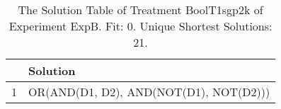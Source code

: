 \begin{table}[ht]
\centering
\begin{tabular}{rp{9cm}}
  \hline
 & Solution \\ 
  \hline
1 & OR(AND(D1, D2), AND(NOT(D1), NOT(D2))) \\ 
   \hline
\end{tabular}
\caption{The Solution Table of Treatment BoolT1sgp2k of Experiment ExpB. Fit: 0. Unique Shortest Solutions: 21.} 
\end{table}
